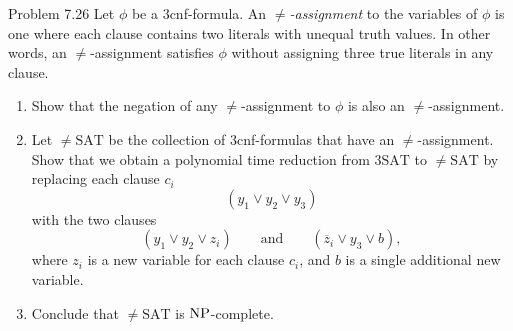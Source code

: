 \begin{question}{Problem 7.26}
Let $\phi$ be a $3$cnf-formula. An \emph{$\neq$-assignment} to the variables of $\phi$ is one where each clause contains two literals with unequal truth values. In other words, an $\neq$-assignment satisfies $\phi$ without assigning three true literals in any clause.
\begin{enumerate}[label=\alph*.]
\item Show that the negation of any $\neq$-assignment to $\phi$ is also an $\neq$-assignment.
\item Let $\neq\mathrm{SAT}$ be the collection of $3$cnf-formulas that have an $\neq$-assignment. Show that we obtain a polynomial time reduction from $3\mathrm{SAT}$ to $\neq\mathrm{SAT}$ by replacing each clause $c_i$
\[
(y_1\lor y_2\lor y_3)
\]
with the two clauses
\[
(y_1\lor y_2\lor z_i)
\qquad\text{and}\qquad
(\overline{z}_i\lor y_3\lor b),
\]
where $z_i$ is a new variable for each clause $c_i$, and $b$ is a single additional new variable.
\item Conclude that $\neq\mathrm{SAT}$ is $\mathrm{NP}$-complete.
\end{enumerate}
\end{question}

